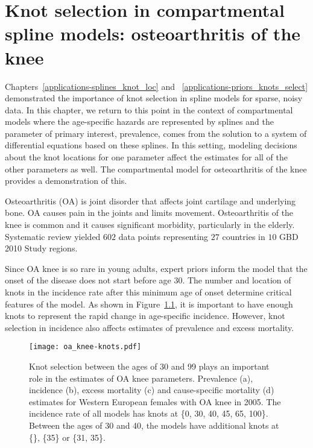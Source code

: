 \chapter{Knot selection in compartmental spline models: osteoarthritis of the knee}
\label{applications-con_fit_splines}

Chapters~\ref{applications-splines_knot_loc} and
~\ref{applications-priors_knots_select} demonstrated the importance of
knot selection in spline models for sparse, noisy data. In this
chapter, we return to this point in the context of compartmental
models where the age-specific hazards are represented by splines and
the parameter of primary interest, prevalence, comes from the solution
to a system of differential equations based on these splines. In this
setting, modeling decisions about the knot locations for one parameter
affect the estimates for all of the other parameters as well.  The
compartmental model for osteoarthritis of the knee provides a
demonstration of this.

Osteoarthritis (OA) is joint disorder that affects joint cartilage and
underlying bone.  OA causes pain in the joints and limits movement.
Osteoarthritis of the knee is common and it causes significant
morbidity, particularly in the
elderly. \cite{felson_epidemiology_1988, felson_incidence_1995}
Systematic review yielded $602$ data points representing $27$ countries
in $10$ GBD 2010 Study regions.

Since OA knee is so rare in young adults, expert priors inform the
model that the onset of the disease does not start before age 30.  The
number and location of knots in the incidence rate after this minimum
age of onset determine critical features of the model. As shown in
Figure~\ref{fig:app-oa knee knots}, it is important to have enough
knots to represent the rapid change in age-specific incidence.
However, knot selection in incidence also affects estimates of
prevalence and excess mortality.

    \begin{figure}[h]
        \begin{center}
            \texttt{[image: oa\_knee-knots.pdf]}
            \caption{Knot selection between the ages of 30 and 99
              plays an important role in the estimates of OA knee
              parameters.  Prevalence (a), incidence (b),
              excess mortality (c) and cause-specific mortality (d)
              estimates for Western European females
              with OA knee in 2005.  The
              incidence rate of all models has knots at \{0, 30,
              40, 45, 65, 100\}.  Between the ages
              of 30 and 40, the models have additional knots at \{\}, \{35\}
              or \{31, 35\}.}
            \label{fig:app-oa knee knots}
        \end{center}
    \end{figure}

